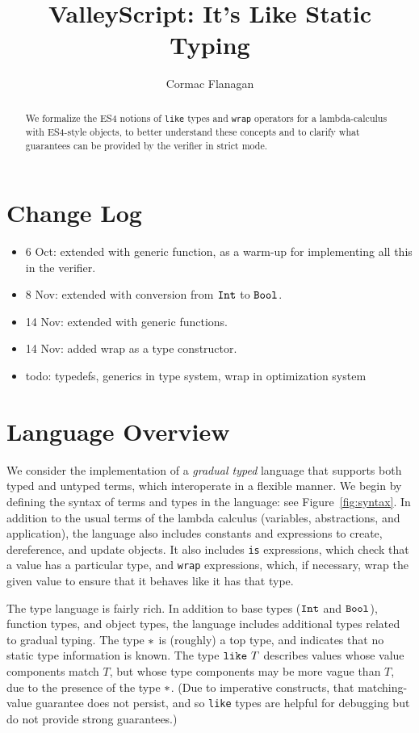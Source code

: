 \documentclass{article}
\newcommand{\Int}{\t{Int}}
\newcommand{\Bool}{\t{Bool}}
\newcommand{\dynamic}{\t{*}}
\renewcommand{\t}[1]{{\tt #1}}
\newcommand{\likety}[1]{\t{like}~#1}
\begin{document}
\title{ValleyScript: It's Like Static Typing
}
\author{Cormac Flanagan}


\maketitle

\begin{abstract}
We formalize the ES4 notions of \t{like} types and \t{wrap} operators for a lambda-calculus with ES4-style objects,
to better understand these concepts and to clarify what guarantees can be provided by the verifier in strict mode.
\end{abstract}

\section{Change Log}
\begin{itemize}
\item
6 Oct: extended with generic function, as a warm-up for implementing all this in the verifier.
\item
8 Nov: extended with conversion from $\Int$ to $\Bool$.
\item
14 Nov: extended with generic functions.
\item
14 Nov: added wrap as a type constructor.
\item
todo: typedefs, generics in type system, wrap in optimization system
\end{itemize}

\section{Language Overview}

We consider the implementation of a \emph{gradual typed} language that supports both
typed and untyped terms, which interoperate in a flexible manner.
We begin by defining the syntax of terms and types in the language: see Figure~\ref{fig:syntax}.
In addition to the usual terms of the lambda calculus (variables, abstractions, and application), 
the language also includes constants and expressions to create, dereference, and update objects.
It also includes \t{is} expressions, which check that a value has a particular type,
and \t{wrap} expressions, which, if necessary, wrap the given value to ensure that it behaves like it has that type. 

The type language is fairly rich. In addition to  base types ($\Int$ and $\Bool$), function types,
and object types, the language includes additional types related to gradual typing.
The type $\dynamic$ is (roughly) a top type, and indicates that no static type information is known.
The type $\likety{T}$ describes values whose value components match $T$, but whose type components may be more vague than $T$, due to the presence of the type $\dynamic$. (Due to imperative constructs, that matching-value guarantee does not persist, and so \t{like} types are helpful for debugging but do not provide strong guarantees.)
\end{document}
